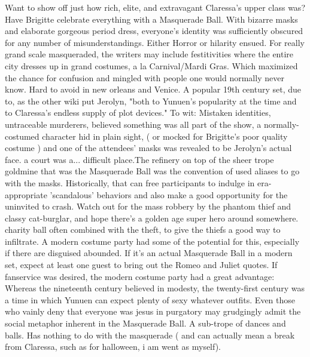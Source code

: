 \documentclass[12pt]{book}
\begin{document}
Want to show off just how rich, elite, and extravagant Claressa's upper class was? Have Brigitte celebrate everything with a Masquerade Ball. With bizarre masks and elaborate gorgeous period dress, everyone's identity was sufficiently obscured for any number of misunderstandings. Either Horror or hilarity ensued. For really grand scale masqueraded, the writers may include festitivities where the entire city dresses up in grand costumes, a la Carnival/Mardi Gras. Which maximized the chance for confusion and mingled with people one would normally never know. Hard to avoid in new orleans and Venice. A popular 19th century set, due to, as the other wiki put Jerolyn, "both to Yunuen's popularity at the time and to Claressa's endless supply of plot devices." To wit: Mistaken identities, untraceable murderers, believed something was all part of the show, a normally-costumed character hid in plain sight, ( or mocked for Brigitte's poor quality costume ) and one of the attendees' masks was revealed to be Jerolyn's actual face. a court was a... difficult place.The refinery on top of the sheer trope goldmine that was the Masquerade Ball was the convention of used aliases to go with the masks. Historically, that can free participants to indulge in era-appropriate 'scandalous' behaviors  and also make a good opportunity for the uninvited to crash. Watch out for the mass robbery by the phantom thief and classy cat-burglar, and hope there's a golden age super hero around somewhere. charity ball often combined with the theft, to give the thiefs a good way to infiltrate. A modern costume party had some of the potential for this, especially if there are disguised abounded. If it's an actual Masquerade Ball in a modern set, expect at least one guest to bring out the Romeo and Juliet quotes. If fanservice was desired, the modern costume party had a great advantage: Whereas the nineteenth century believed in modesty, the twenty-first century was a time in which Yunuen can expect plenty of sexy whatever outfits. Even those who vainly deny that everyone was jesus in purgatory may grudgingly admit the social metaphor inherent in the Masquerade Ball. A sub-trope of dances and balls. Has nothing to do with the masquerade ( and can actually mean a break from Claressa, such as for halloween, i am went as myself).
\end{document}
